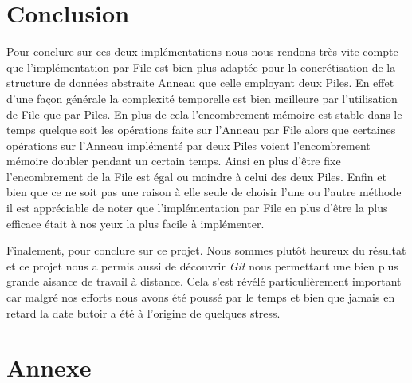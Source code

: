 \documentclass{article}
\begin{document}
\section{Conclusion}

Pour conclure sur ces deux implémentations nous nous rendons très vite compte que l'implémentation par File est bien plus adaptée pour la concrétisation de la structure de données abstraite Anneau que celle employant deux Piles. En effet d'une façon générale la complexité temporelle est bien meilleure par l'utilisation de File que par Piles. En plus de cela l'encombrement mémoire est stable dans le temps quelque soit les opérations faite sur l'Anneau par File alors que certaines opérations sur l'Anneau implémenté par deux Piles voient l'encombrement mémoire doubler pendant un certain temps. Ainsi en plus d'être fixe l'encombrement de la File est égal ou moindre à celui des deux Piles. Enfin et bien que ce ne soit pas une raison à elle seule de choisir l'une ou l'autre méthode il est appréciable de noter que l'implémentation par File en plus d'être la plus efficace était à nos yeux la plus facile à implémenter.

Finalement, pour conclure sur ce projet. Nous sommes plutôt heureux du résultat et ce projet nous a permis aussi de découvrir \emph{Git} nous permettant une bien plus grande aisance de travail à distance. Cela s'est révélé particulièrement important car malgré nos efforts nous avons été poussé par le temps et bien que jamais en retard la date butoir a été à l'origine de quelques stress.

\newpage
\appendix

\section*{Annexe}
\end{document}
